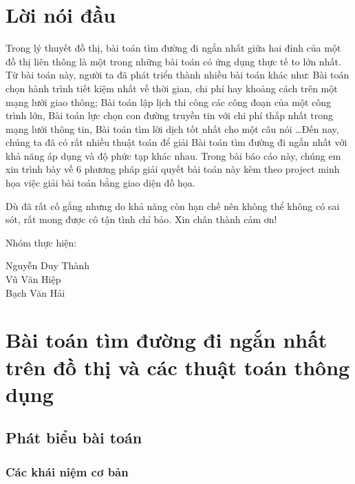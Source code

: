 \documentclass[a4paper,12pt]{report}
\begin{document}
	\newpage

	\tableofcontents
	\newpage
\chapter*{Lời nói đầu}



		Trong lý thuyết đồ thị, bài toán tìm đường đi ngắn nhất giữa hai đỉnh của một đồ thị liên thông là một trong những bài toán có ứng dụng thực tế to lớn nhất. Từ bài toán này, người ta đã phát triển thành nhiều bài toán khác như: Bài toán chọn hành trình tiết kiệm nhất về thời gian, chi phí hay khoảng cách trên một mạng lưới giao thông; Bài toán lập lịch thi công các công đoạn của một công trình lớn, Bài toán lực chọn con đường truyền tin với chi phí thấp nhất trong mạng lưới thông tin, Bài toán tìm lời dịch tốt nhất cho một câu nói \ldots Đến nay, chúng ta đã có rất nhiều thuật toán để giải Bài toán tìm đường đi ngắn nhất với khả năng áp dụng và độ phức tạp khác nhau. Trong bài báo cáo này, chúng em xin trình bày về 6 phương pháp giải quyết bài toán này kèm theo project minh họa việc giải bài toán bằng giao diện đồ họa.


	Dù đã rất cố gắng nhưng do khả năng còn hạn chế nên không thể không có sai sót, rất mong được cô tận tình chỉ bảo. Xin chân thành cảm ơn!\\[1cm]
	\begin{center}
		Nhóm thực hiện:
	\end{center}
	
	\begin{flushright}
		\parbox[t]{4cm}{Nguyễn Duy Thành \\
		Vũ Văn Hiệp\\
		Bạch Văn Hải}
	\end{flushright}



\chapter{Bài toán tìm đường đi ngắn nhất trên đồ thị và các thuật toán thông dụng}

\section{Phát biểu bài toán}

\subsection{Các khái niệm cơ bản}
\end{document}
